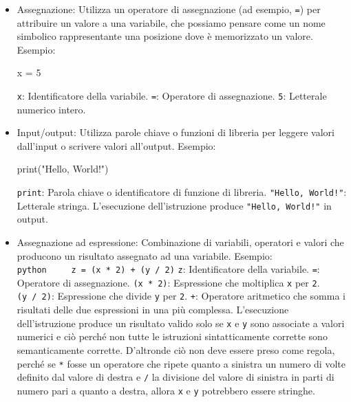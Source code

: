 \documentclass[
  letterpaper,
  DIV=11,
  numbers=noendperiod]{scrreprt}
\newenvironment{Shaded}{\begin{snugshade}}{\end{snugshade}}
\newcommand{\BuiltInTok}[1]{\textcolor[rgb]{0.00,0.23,0.31}{#1}}
\newcommand{\DecValTok}[1]{\textcolor[rgb]{0.68,0.00,0.00}{#1}}
\newcommand{\NormalTok}[1]{\textcolor[rgb]{0.00,0.23,0.31}{#1}}
\newcommand{\OperatorTok}[1]{\textcolor[rgb]{0.37,0.37,0.37}{#1}}
\newcommand{\StringTok}[1]{\textcolor[rgb]{0.13,0.47,0.30}{#1}}
\begin{document}
\begin{itemize}
\item
  Assegnazione: Utilizza un operatore di assegnazione (ad esempio,
  \texttt{=}) per attribuire un valore a una variabile, che possiamo
  pensare come un nome simbolico rappresentante una posizione dove è
  memorizzato un valore. Esempio:

\begin{Shaded}
\begin{Highlighting}[]
\NormalTok{x }\OperatorTok{=} \DecValTok{5}
\end{Highlighting}
\end{Shaded}

  \texttt{x}: Identificatore della variabile. \texttt{=}: Operatore di
  assegnazione. \texttt{5}: Letterale numerico intero.
\item
  Input/output: Utilizza parole chiave o funzioni di libreria per
  leggere valori dall'input o scrivere valori all'output. Esempio:

\begin{Shaded}
\begin{Highlighting}[]
\BuiltInTok{print}\NormalTok{(}\StringTok{"Hello, World!"}\NormalTok{)}
\end{Highlighting}
\end{Shaded}

  \texttt{print}: Parola chiave o identificatore di funzione di
  libreria. \texttt{"Hello,\ World!"}: Letterale stringa. L'esecuzione
  dell'istruzione produce \texttt{"Hello,\ World!"} in output.
\item
  Assegnazione ad espressione: Combinazione di variabili, operatori e
  valori che producono un risultato assegnato ad una variabile. Esempio:
  \texttt{python\ \ \ \ \ z\ =\ (x\ *\ 2)\ +\ (y\ /\ 2)} \texttt{z}:
  Identificatore della variabile. \texttt{=}: Operatore di assegnazione.
  \texttt{(x\ *\ 2)}: Espressione che moltiplica \texttt{x} per
  \texttt{2}. \texttt{(y\ /\ 2)}: Espressione che divide \texttt{y} per
  \texttt{2}. \texttt{+}: Operatore aritmetico che somma i risultati
  delle due espressioni in una più complessa. L'esecuzione
  dell'istruzione produce un risultato valido solo se \texttt{x} e
  \texttt{y} sono associate a valori numerici e ciò perché non tutte le
  istruzioni sintatticamente corrette sono semanticamente corrette.
  D'altronde ciò non deve essere preso come regola, perché se \texttt{*}
  fosse un operatore che ripete quanto a sinistra un numero di volte
  definito dal valore di destra e \texttt{/} la divisione del valore di
  sinistra in parti di numero pari a quanto a destra, allora \texttt{x}
  e \texttt{y} potrebbero essere stringhe.
\end{itemize}
\end{document}
